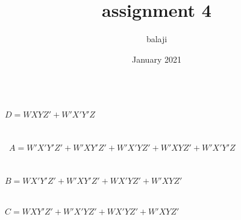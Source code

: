 \documentclass{article}
\title{assignment 4}
\author{balaji }
\date{January 2021}
\begin{document}
\\
$D=WXYZ'+W'X'Y'Z$\\\\\\\
$A=W'X'Y'Z'+W'XY'Z'+W'X'YZ'+W'XYZ'+W'X'Y'Z$\\\\\\
$B=WX'Y'Z'+W'XY'Z'+WX'YZ'+W'XYZ'$\\\\\\
$C=WXY'Z'+W'X'YZ'+WX'YZ'+W'XYZ'$\\
\end{document}
